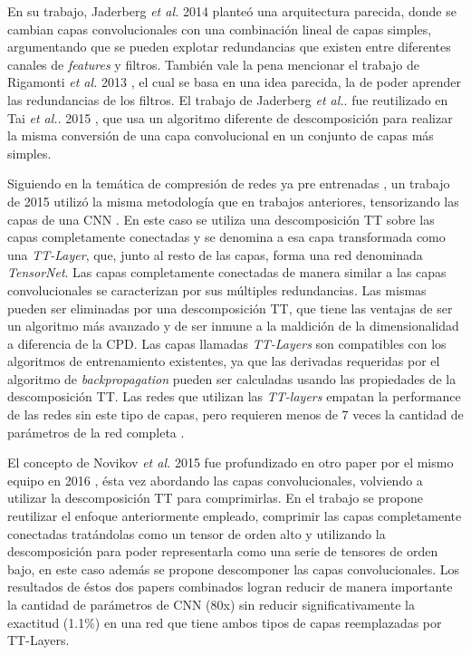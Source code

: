 \documentclass[spanish]{article}
\theoremstyle{definition}
\theoremstyle{remark}
\numberwithin{equation}{section}
\numberwithin{equation}{section} %
\begin{document}
En su trabajo, Jaderberg \textit{et al.} 2014 \cite{jaderberg2014speeding} planteó una arquitectura parecida, donde se cambian capas convolucionales con una combinación lineal de capas simples, argumentando que se pueden explotar redundancias que existen entre diferentes canales de \textit{features} y filtros. También vale la pena mencionar el trabajo de Rigamonti \textit{et al.} 2013 \cite{rigamonti2013learning}, el cual se basa en una idea parecida, la de poder aprender las redundancias de los filtros. El trabajo de Jaderberg \textit{et al.}. \cite{jaderberg2014speeding} fue reutilizado en Tai \textit{et al.}. 2015 \cite{tai2015convolutional}, que usa un algoritmo diferente de descomposición para realizar la misma conversión de una capa convolucional en un conjunto de capas más simples.
\par
Siguiendo en la temática de compresión de redes ya pre entrenadas \cite{lebedev2014speeding}, un trabajo de 2015 \cite{novikov2015tensorizing} utilizó la misma metodología que en trabajos anteriores, tensorizando las capas de una CNN \cite{simonyan2014very}. En este caso \cite{novikov2015tensorizing} se utiliza una descomposición TT \cite{oseledets2011tensor} sobre las capas completamente conectadas y se denomina a esa capa transformada como una \textit{TT-Layer}, que, junto al resto de las capas, forma una red denominada  \textit{TensorNet}. Las capas completamente conectadas de manera similar a las capas convolucionales se caracterizan por sus múltiples redundancias. Las mismas pueden ser eliminadas por una descomposición TT, que tiene las ventajas de ser un algoritmo más avanzado y de ser inmune a la maldición de la dimensionalidad a diferencia de la CPD. Las capas llamadas \textit{TT-Layers} son compatibles con los algoritmos de entrenamiento existentes, ya que las derivadas requeridas por el algoritmo de {\it backpropagation} pueden ser calculadas usando las propiedades de la descomposición TT. Las redes que utilizan las \textit{TT-layers} empatan la performance de las redes sin este tipo de capas, pero requieren menos de 7 veces la cantidad de parámetros de la red completa  \cite{novikov2015tensorizing}.   \par
El concepto de Novikov \textit{et al.} 2015 \cite{novikov2015tensorizing} fue profundizado en otro paper por el mismo equipo en 2016 \cite{garipov2016ultimate}, ésta vez abordando las capas convolucionales, volviendo a utilizar la descomposición TT \cite{oseledets2011tensor} para comprimirlas. En el trabajo se propone reutilizar el enfoque anteriormente empleado, comprimir las capas completamente conectadas tratándolas como un tensor de orden alto y utilizando la descomposición para poder representarla como una serie de tensores de orden bajo, en este caso además se propone descomponer las capas convolucionales. Los resultados de éstos dos papers combinados logran reducir de manera importante la cantidad de parámetros de CNN (80x) sin reducir significativamente la exactitud (1.1\%) en una red que tiene ambos tipos de capas reemplazadas por TT-Layers. \par
\end{document}
